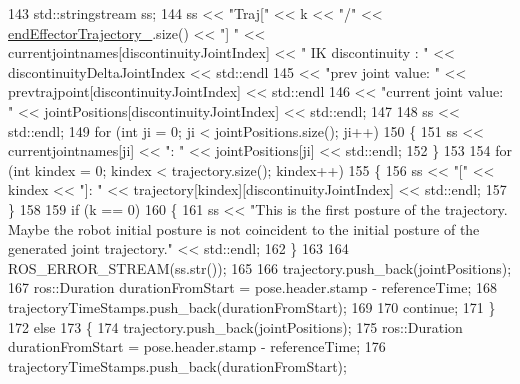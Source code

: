 \begin{DoxyCode}
143                         std::stringstream ss;
144                         ss << \textcolor{stringliteral}{"Traj["} << k << \textcolor{stringliteral}{"/"} << \hyperlink{classcl__move__group__interface_1_1CbMoveEndEffectorTrajectory_ae13dfd31ea3660646e03882f0c2c29f0}{endEffectorTrajectory\_}.size() <<
       \textcolor{stringliteral}{"] "} << currentjointnames[discontinuityJointIndex] << \textcolor{stringliteral}{" IK discontinuity : "} << 
      discontinuityDeltaJointIndex << std::endl
145                            << \textcolor{stringliteral}{"prev joint value: "} << prevtrajpoint[discontinuityJointIndex] << std::endl
146                            << \textcolor{stringliteral}{"current joint value: "} << jointPositions[discontinuityJointIndex] << 
      std::endl;
147 
148                         ss << std::endl;
149                         \textcolor{keywordflow}{for} (\textcolor{keywordtype}{int} ji = 0; ji < jointPositions.size(); ji++)
150                         \{
151                             ss << currentjointnames[ji] << \textcolor{stringliteral}{": "} << jointPositions[ji] << std::endl;
152                         \}
153 
154                         \textcolor{keywordflow}{for} (\textcolor{keywordtype}{int} kindex = 0; kindex < trajectory.size(); kindex++)
155                         \{
156                             ss << \textcolor{stringliteral}{"["} << kindex << \textcolor{stringliteral}{"]: "} << trajectory[kindex][discontinuityJointIndex] << 
      std::endl;
157                         \}
158 
159                         \textcolor{keywordflow}{if} (k == 0)
160                         \{
161                             ss << \textcolor{stringliteral}{"This is the first posture of the trajectory. Maybe the robot initial
       posture is not coincident to the initial posture of the generated joint trajectory."} << std::endl;
162                         \}
163 
164                         ROS\_ERROR\_STREAM(ss.str());
165 
166                         trajectory.push\_back(jointPositions);
167                         ros::Duration durationFromStart = pose.header.stamp - referenceTime;
168                         trajectoryTimeStamps.push\_back(durationFromStart);
169 
170                         \textcolor{keywordflow}{continue};
171                     \}
172                     \textcolor{keywordflow}{else}
173                     \{
174                         trajectory.push\_back(jointPositions);
175                         ros::Duration durationFromStart = pose.header.stamp - referenceTime;
176                         trajectoryTimeStamps.push\_back(durationFromStart);

\end{DoxyCode}
